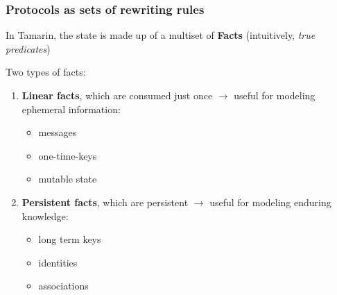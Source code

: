 \documentclass[aspectratio=169,t,xcolor=table]{beamer}
\begin{document}
\begin{frame}
    \frametitle{Protocols as sets of rewriting rules}
        In Tamarin, the state is made up of a multiset of \textbf{Facts} (intuitively, \textit{true predicates})
        
        Two types of facts:
        \begin{enumerate}
            \item \textbf{Linear facts}, which are consumed just once $\to$ useful for modeling ephemeral information:
            \begin{itemize}
                \item messages
                \item one-time-keys
                \item mutable state
            \end{itemize}
            \item \textbf{Persistent facts}, which are persistent $\to$ useful for modeling enduring knowledge:
            \begin{itemize}
                \item long term keys
                \item identities
                \item associations
            \end{itemize}
        \end{enumerate}
\end{frame}
\end{document}
